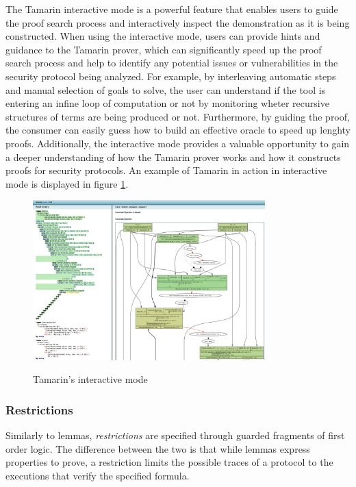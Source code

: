 \documentclass[fleqn,10pt]{SelfArx} %
\begin{document}
The Tamarin interactive mode is a powerful feature that enables users to guide the proof search process and interactively inspect the demonstration as it is being constructed. When using the interactive mode, users can provide hints and guidance to the Tamarin prover, which can significantly speed up the proof search process and help to identify any potential issues or vulnerabilities in the security protocol being analyzed. For example, by interleaving automatic steps and manual selection of goals to solve, the user can understand if the tool is entering an infine loop of computation or not by monitoring wheter recursive structures of terms are being produced or not. Furthermore, by guiding the proof, the consumer can easily guess how to build an effective oracle to speed up lenghty proofs. Additionally, the interactive mode provides a valuable opportunity to gain a deeper understanding of how the Tamarin prover works and how it constructs proofs for security protocols. An example of Tamarin in action in interactive mode is displayed in figure \ref{fig:interactive}.

\begin{figure}
    \centering
    \captionsetup{justification=centering, margin=1cm}
    \includegraphics[width=0.8\textwidth]{Figures/gui.png}
    \label{fig:interactive}
    \caption{Tamarin's interactive mode}
\end{figure}

\subsubsection{Restrictions}

Similarly to lemmas, \textit{restrictions} are specified through guarded fragments of first order logic. The difference between the two is that while lemmas express properties to prove, a restriction limits the possible traces of a protocol to the executions that verify the specified formula.
\end{document}
